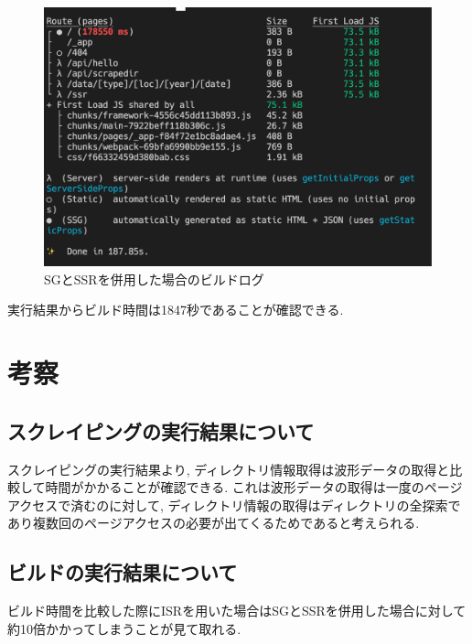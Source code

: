 \begin{figure}[htbp]
	\begin{center}
		\includegraphics[width=\linewidth]{SGandSSR.png}
		\caption{SGとSSRを併用した場合のビルドログ}\label{fig:SG-SSR-build}
	\end{center}
\end{figure}

実行結果からビルド時間は1847秒であることが確認できる.

\section{考察}
\subsection{スクレイピングの実行結果について}
スクレイピングの実行結果より, ディレクトリ情報取得は波形データの取得と比較して時間がかかることが確認できる.
これは波形データの取得は一度のページアクセスで済むのに対して, ディレクトリ情報の取得はディレクトリの全探索であり複数回のページアクセスの必要が出てくるためであると考えられる.

\subsection{ビルドの実行結果について}
ビルド時間を比較した際にISRを用いた場合はSGとSSRを併用した場合に対して約10倍かかってしまうことが見て取れる.

